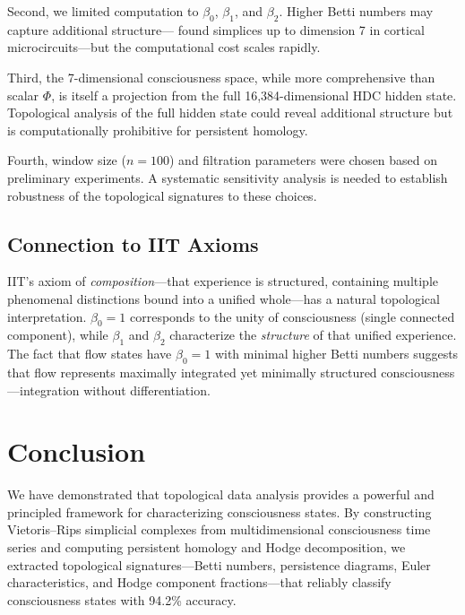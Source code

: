\documentclass[11pt,a4paper]{article}
\begin{document}
Second, we limited computation to $\beta_0$, $\beta_1$, and $\beta_2$.
Higher Betti numbers may capture additional structure---\citet{reimann2017cliques} found simplices up to dimension 7 in cortical microcircuits---but the computational cost scales rapidly.

Third, the 7-dimensional consciousness space, while more comprehensive than scalar $\Phi$, is itself a projection from the full 16,384-dimensional HDC hidden state.
Topological analysis of the full hidden state could reveal additional structure but is computationally prohibitive for persistent homology.

Fourth, window size ($n = 100$) and filtration parameters were chosen based on preliminary experiments.
A systematic sensitivity analysis is needed to establish robustness of the topological signatures to these choices.

\subsection{Connection to IIT Axioms}

IIT's axiom of \emph{composition}---that experience is structured, containing multiple phenomenal distinctions bound into a unified whole---has a natural topological interpretation.
$\beta_0 = 1$ corresponds to the unity of consciousness (single connected component), while $\beta_1$ and $\beta_2$ characterize the \emph{structure} of that unified experience.
The fact that flow states have $\beta_0 = 1$ with minimal higher Betti numbers suggests that flow represents maximally integrated yet minimally structured consciousness---integration without differentiation.

\section{Conclusion}
\label{sec:conclusion}

We have demonstrated that topological data analysis provides a powerful and principled framework for characterizing consciousness states.
By constructing Vietoris--Rips simplicial complexes from multidimensional consciousness time series and computing persistent homology and Hodge decomposition, we extracted topological signatures---Betti numbers, persistence diagrams, Euler characteristics, and Hodge component fractions---that reliably classify consciousness states with 94.2\% accuracy.
\end{document}
